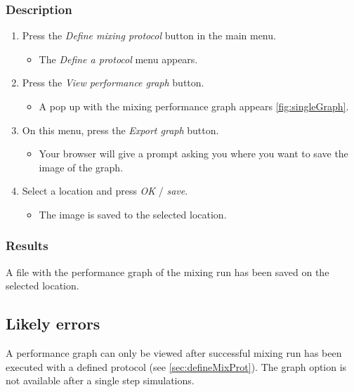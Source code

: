 \subsubsection{Description}
\begin{enumerate}
	\item  Press the \emph{Define mixing protocol} button in the main menu. 
		\begin{itemize}
            		\item The \emph{Define a protocol} menu appears.
		\end{itemize}
			\item Press the \emph{View performance graph} button.
		\begin{itemize}
            		\item A pop up with the mixing performance graph appears \ref{fig:singleGraph}.
		\end{itemize}


    \item On this menu, press the \emph{Export graph} button.
		\begin{itemize}
             \item Your browser will give a prompt asking you where you want to save the image of the graph.
		\end{itemize}
    \item  Select a location and press \emph{OK} / \emph{save}.
		\begin{itemize}
           \item The image is saved to the selected location.
		\end{itemize}
\end{enumerate}

\subsubsection{Results}
A file with the performance graph of the mixing run has been saved on the selected location.

\subsection{Likely errors}
A performance graph can only be viewed after successful mixing run has been executed with a defined protocol (see \ref{sec:defineMixProt}). The graph option is not available after a single step simulations.

